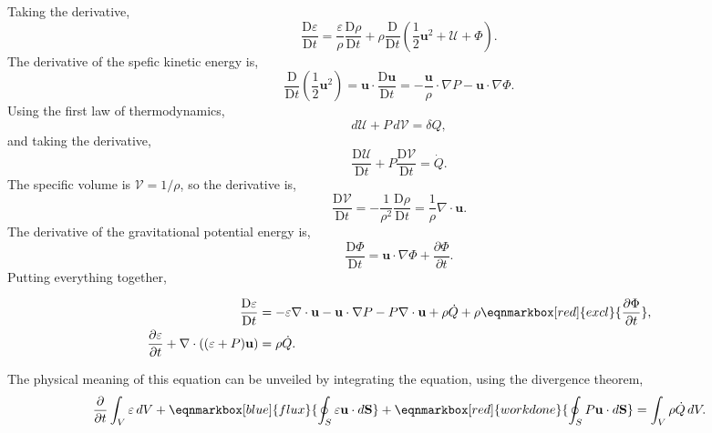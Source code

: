 Taking the derivative, 
\begin{equation}
  \frac{\text{D}\varepsilon}{\text{D}t} = \frac{\varepsilon}{\rho}\frac{\text{D}\rho}{\text{D} t} + \rho\frac{\text{D}}{\text{D}t}\left(\frac{1}{2}\mathbf{u}^2 + \mathcal{U} + \Phi\right). 
\end{equation}
The derivative of the spefic kinetic energy is,
\begin{equation}
\frac{\text{D}}{\text{D}t}\left(\frac{1}{2}\mathbf{u}^2\right) = \mathbf{u}\cdot\frac{\text{D}\mathbf{u}}{\text{D}t} = -\frac{\mathbf{u}}{\rho}\cdot\nabla P - \mathbf{u}\cdot\nabla\Phi.
\end{equation} 
Using the first law of thermodynamics,
\begin{equation}
  d\mathcal{U} + P\,d\mathcal{V} = \delta Q,
\end{equation}
and taking the derivative, 
\begin{equation}
  \frac{\text{D}\mathcal{U}}{\text{D}t} + P\frac{\text{D}\mathcal{V}}{\text{D}t} = \dot Q.
\end{equation}
The specific volume is $\mathcal{V} = 1/\rho$, so the derivative is, 
\begin{equation}
  \frac{\text{D}\mathcal{V}}{\text{D}t} = -\frac{1}{\rho^2}\frac{\text{D}\rho}{\text{D}t} = \frac{1}{\rho}\nabla\cdot\mathbf{u}. 
\end{equation}
The derivative of the gravitational potential energy is,
\begin{equation}
  \frac{\text{D}\Phi}{\text{D}t} = \mathbf{u}\cdot\nabla\Phi + \frac{\partial\Phi}{\partial t}. 
\end{equation} 
Putting everything together,
\begin{definition}
\begin{equation}
  \begin{aligned}
    \frac{\text{D}\varepsilon}{\text{D}t} &= -\varepsilon\nabla\cdot\mathbf{u} - \mathbf{u}\cdot\nabla P - P\nabla\cdot\mathbf{u} + \rho\dot Q + \rho\eqnmarkbox[red]{excl}{\frac{\partial\Phi}{\partial t}},\\
    \frac{\partial \varepsilon}{\partial t} + \nabla\cdot((\varepsilon + P)\mathbf{u}) &= \rho\dot Q.
  \end{aligned}
\end{equation}
\vspace{-5mm}
\end{definition}
The physical meaning of this equation can be unveiled by integrating the equation, using the divergence theorem,
\begin{equation}
  \frac{\partial}{\partial t}\int_V \varepsilon\,dV + \eqnmarkbox[blue]{flux}{\oint_S \varepsilon\mathbf{u}\cdot d\mathbf{S}} + \eqnmarkbox[red]{workdone}{\oint_S P\mathbf{u}\cdot d\mathbf{S}} = \int_V \rho\dot Q\,dV. 
\end{equation}
\\

